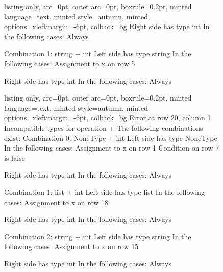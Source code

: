 \begin{figure}[!h]
\begin{minipage}{\textwidth}
\begin{minipage}{0.5\textwidth}
\begin{tcblisting}{listing only, 
    arc=0pt,
    outer arc=0pt, 
    boxrule=0.2pt,
    minted language=text,
    minted style=autumn,
    minted options={xleftmargin=-6pt},
    colback=bg }
  Right side has type int
  In the following cases:
   Always


 Combination 1: string + int
  Left side has type string
  In the following cases:
   Assignment to x on row 5

  Right side has type int
  In the following cases:
   Always

\end{tcblisting}
 \end{minipage}
 \begin{minipage}{0.5\textwidth}
  \begin{tcblisting}{listing only, 
    arc=0pt,
    outer arc=0pt, 
    boxrule=0.2pt,
    minted language=text,
    minted style=autumn,
    minted options={xleftmargin=-6pt},
    colback=bg }
Error at row 20, column 1
 Incompatible types for operation +
 The following combinations exist:
 Combination 0: NoneType + int
  Left side has type NoneType
  In the following cases:
   Assignment to x on row 1
   Condition on row 7 is false

  Right side has type int
  In the following cases:
   Always


 Combination 1: list + int
  Left side has type list
  In the following cases:
   Assignment to x on row 18

  Right side has type int
  In the following cases:
   Always


 Combination 2: string + int
  Left side has type string
  In the following cases:
   Assignment to x on row 15

  Right side has type int
  In the following cases:
   Always
\end{tcblisting}
 \end{minipage}
 \end{minipage}
 \label{lst:break3}
\end{figure}